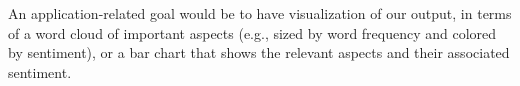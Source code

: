 \documentclass{article} %
\begin{document}
An application-related goal would be to have visualization of our output, in terms of a word cloud of important aspects (e.g., sized by word frequency and colored by sentiment), or a bar chart that shows the relevant aspects and their associated sentiment.


%
\end{document}
